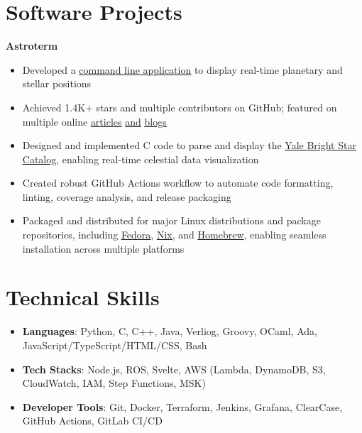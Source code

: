 \documentclass[letterpaper,10pt]{article}
\newcommand{\itemsBegin}{
    \begin{itemize}[leftmargin=0.2in, labelsep=0.05in, itemsep=0pt, parsep=1pt, topsep=0pt, partopsep=0pt]
    \small
}
\newcommand{\itemsEnd}{\end{itemize}}
\begin{document}
\section{Software Projects}

    \normalsize \textbf{Astroterm}

    \itemsBegin{}
        \item Developed a
        \href{https://github.com/da-luce/astroterm}{\underline{command line application}}
        to display real-time planetary and stellar positions
        \item Achieved 1.4K+ stars and multiple contributors on GitHub; featured on multiple online
        \href{https://www.linuxlinks.com/astroterm-terminal-based-star-map/}{\underline{articles}}
        \href{https://github.com/toolleeo/awesome-cli-apps-in-a-csv?tab=readme-ov-file#graphics}{\underline{and}}
        \href{https://terminaltrove.com/astroterm/}{\underline{blogs}}
        \item Designed and implemented C code to parse and display the
        \href{https://tdc-www.harvard.edu/catalogs/bsc5.html}{\underline{Yale Bright Star Catalog}},
        enabling real-time celestial data visualization
        \item Created robust GitHub Actions workflow to automate code formatting, linting, coverage analysis, and release packaging
        \item Packaged and distributed for major Linux distributions and package repositories, including
        \href{https://packages.fedoraproject.org/pkgs/astroterm/astroterm/index.html}{\underline{Fedora}},
        \href{https://search.nixos.org/packages?channel=unstable&show=astroterm&from=0&size=50&sort=relevance&type=packages&query=astroterm}{\underline{Nix}}, and
        \href{https://formulae.brew.sh/formula/astroterm#default}{\underline{Homebrew}},
        enabling seamless installation across multiple platforms
    \itemsEnd{}

\section{Technical Skills}

    \itemsBegin{}
        \item \textbf{Languages}{: Python, C, C++, Java, Verliog, Groovy, OCaml, Ada, JavaScript/TypeScript/HTML/CSS, Bash}
        \item \textbf{Tech Stacks}{: Node.js, ROS, Svelte, AWS (Lambda, DynamoDB, S3, CloudWatch, IAM, Step Functions, MSK)}
        \item \textbf{Developer Tools}{: Git, Docker, Terraform, Jenkins, Grafana, ClearCase, GitHub Actions, GitLab CI/CD }
    \itemsEnd{}
\end{document}
